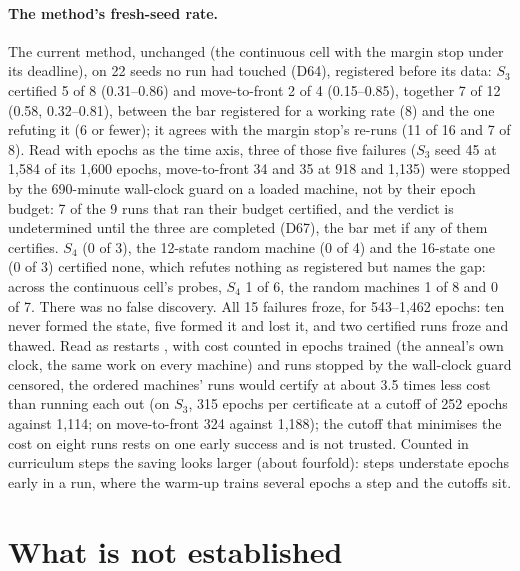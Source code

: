 \documentclass[11pt]{article}
\begin{document}
\paragraph{The method's fresh-seed rate.} The current method, unchanged (the continuous cell with the
margin stop under its deadline), on 22 seeds no run had touched (D64), registered before its data:
$S_3$ certified 5 of 8 (0.31--0.86) and move-to-front 2 of 4 (0.15--0.85), together 7 of 12 (0.58,
0.32--0.81), between the bar registered for a working rate (8) and the one refuting it (6 or fewer); it
agrees with the margin stop's re-runs (11 of 16 and 7 of 8). Read with epochs as the time axis, three
of those five failures ($S_3$ seed 45 at 1,584 of its 1,600 epochs, move-to-front 34 and 35 at 918 and
1,135) were stopped by the 690-minute wall-clock guard on a loaded machine, not by their epoch budget:
7 of the 9 runs that ran their budget certified, and the verdict is undetermined until the three are
completed (D67), the bar met if any of them certifies. $S_4$ (0 of 3), the 12-state random
machine (0 of 4) and the 16-state one (0 of 3) certified none, which refutes nothing as registered but
names the gap: across the continuous cell's probes, $S_4$ 1 of 6, the random machines 1 of 8 and 0 of
7. There was no false discovery. All 15 failures froze, for 543--1,462 epochs: ten never formed the
state, five formed it and lost it, and two certified runs froze and thawed. Read as restarts
\citep{luby-1993-optimal-speedup-las-vegas-algorithms}, with cost counted in epochs trained (the
anneal's own clock, the same work on every machine) and runs stopped by the wall-clock guard censored,
the ordered machines' runs would certify at about 3.5 times less cost than running each out (on
$S_3$, 315 epochs per certificate at a cutoff of 252 epochs against 1,114; on move-to-front 324
against 1,188); the cutoff that minimises the cost on eight runs rests on one early success and is
not trusted. Counted in curriculum steps the saving looks larger (about fourfold): steps understate
epochs early in a run, where the warm-up trains several epochs a step and the cutoffs sit.

\section{What is not established}
\label{sec:open}
\end{document}
